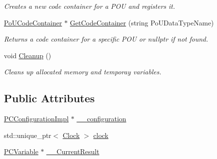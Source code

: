 \begin{DoxyCompactItemize}
\begin{DoxyCompactList}\small\item\em Creates a new code container for a P\+OU and registers it. \end{DoxyCompactList}\item 
\hyperlink{classpc__emulator_1_1PoUCodeContainer}{Po\+U\+Code\+Container} $\ast$ \hyperlink{classpc__emulator_1_1PCResourceImpl_a93b852f67ddca8d086b19a0c7daf7c42}{Get\+Code\+Container} (string Po\+U\+Data\+Type\+Name)\hypertarget{classpc__emulator_1_1PCResourceImpl_a93b852f67ddca8d086b19a0c7daf7c42}{}\label{classpc__emulator_1_1PCResourceImpl_a93b852f67ddca8d086b19a0c7daf7c42}

\begin{DoxyCompactList}\small\item\em Returns a code container for a specific P\+OU or nullptr if not found. \end{DoxyCompactList}\item 
void \hyperlink{classpc__emulator_1_1PCResourceImpl_a3d9ad2276414e07af0a9b435e17faad0}{Cleanup} ()\hypertarget{classpc__emulator_1_1PCResourceImpl_a3d9ad2276414e07af0a9b435e17faad0}{}\label{classpc__emulator_1_1PCResourceImpl_a3d9ad2276414e07af0a9b435e17faad0}

\begin{DoxyCompactList}\small\item\em Cleans up allocated memory and temporay variables. \end{DoxyCompactList}\end{DoxyCompactItemize}
\subsection*{Public Attributes}
\begin{DoxyCompactItemize}
\item 
\hyperlink{classpc__emulator_1_1PCConfigurationImpl}{P\+C\+Configuration\+Impl} $\ast$ \hyperlink{classpc__emulator_1_1PCResourceImpl_a356a5f4a62005c9aee4f6ef8538ced11}{\+\_\+\+\_\+configuration}
\item 
std\+::unique\+\_\+ptr$<$ \hyperlink{classpc__emulator_1_1Clock}{Clock} $>$ \hyperlink{classpc__emulator_1_1PCResourceImpl_ad49b0d4eb79f506f03f37518e1e70d1e}{clock}
\item 
\hyperlink{classpc__emulator_1_1PCVariable}{P\+C\+Variable} $\ast$ \hyperlink{classpc__emulator_1_1PCResourceImpl_a3648237ffd6fc0c0d569b18f7142154f}{\+\_\+\+\_\+\+Current\+Result}
\end{DoxyCompactItemize}


